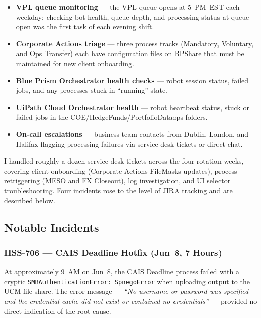 \begin{itemize}
    \item \textbf{VPL queue monitoring} --- the VPL queue opens at 5~PM~EST
          each weekday; checking bot health, queue depth, and processing status
          at queue open was the first task of each evening shift.
    \item \textbf{Corporate Actions triage} --- three process tracks
          (Mandatory, Voluntary, and Ops Transfer) each have configuration files
          on BPShare that must be maintained for new client onboarding.
    \item \textbf{Blue Prism Orchestrator health checks} --- robot session status,
          failed jobs, and any processes stuck in ``running'' state.
    \item \textbf{UiPath Cloud Orchestrator health} --- robot heartbeat status,
          stuck or failed jobs in the COE/HedgeFunds/PortfolioDataops folders.
    \item \textbf{On-call escalations} --- business team contacts from
          Dublin, London, and Halifax flagging processing failures via
          service desk tickets or direct chat.
\end{itemize}

I handled roughly a dozen service desk tickets across the four rotation
weeks, covering client onboarding (Corporate Actions FileMasks updates),
process retriggering (MESO and FX Closeout), log investigation, and UI
selector troubleshooting. Four incidents rose to the level of JIRA tracking
and are described below.

\subsection{Notable Incidents}

\subsubsection{IISS-706 --- CAIS Deadline Hotfix (Jun~8, 7 Hours)}

At approximately 9~AM on Jun~8, the CAIS Deadline process failed with a
cryptic \texttt{SMBAuthenticationError: SpnegoError} when uploading output
to the UCM file share. The error message --- \textit{``No username or password
was specified and the credential cache did not exist or contained no
credentials''} --- provided no direct indication of the root cause.

